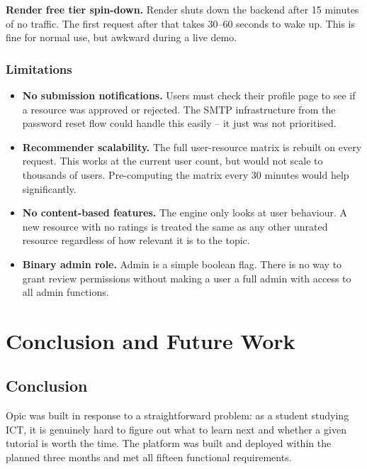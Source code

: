 \documentclass[12pt,a4paper]{report}
\begin{document}
\textbf{Render free tier spin-down.} Render shuts down the backend after 15 minutes of no traffic. The first request after that takes 30--60 seconds to wake up. This is fine for normal use, but awkward during a live demo.

\subsection{Limitations}

\begin{itemize}
  \item \textbf{No submission notifications.} Users must check their profile page to see if a resource was approved or rejected. The SMTP infrastructure from the password reset flow could handle this easily -- it just was not prioritised.
  \item \textbf{Recommender scalability.} The full user-resource matrix is rebuilt on every request. This works at the current user count, but would not scale to thousands of users. Pre-computing the matrix every 30 minutes would help significantly.
  \item \textbf{No content-based features.} The engine only looks at user behaviour. A new resource with no ratings is treated the same as any other unrated resource regardless of how relevant it is to the topic.
  \item \textbf{Binary admin role.} Admin is a simple boolean flag. There is no way to grant review permissions without making a user a full admin with access to all admin functions.
\end{itemize}

\newpage

\chapter{Conclusion and Future Work}

\section{Conclusion}

Opic was built in response to a straightforward problem: as a student studying ICT, it is genuinely hard to figure out what to learn next and whether a given tutorial is worth the time. The platform was built and deployed within the planned three months and met all fifteen functional requirements.
\end{document}
